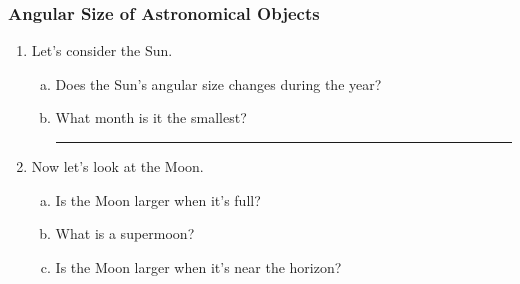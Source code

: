 \documentclass[main.tex]{subfiles}
\begin{document}
\subsubsection{Angular Size of Astronomical Objects}
\begin{enumerate}
\item Let's consider the Sun.
	\begin{enumerate}[a.]
	\item Does the Sun's angular size changes during the year?
	\item What month is it the smallest? \rule{2cm}{.15mm}
	\end{enumerate}

\item Now let's look at the Moon.
	\begin{enumerate}[a.]
	\item Is the Moon larger when it's full?
	\item What is a supermoon?
	\item Is the Moon larger when it's near the horizon?
	\end{enumerate}

\end{enumerate}
\end{document}

